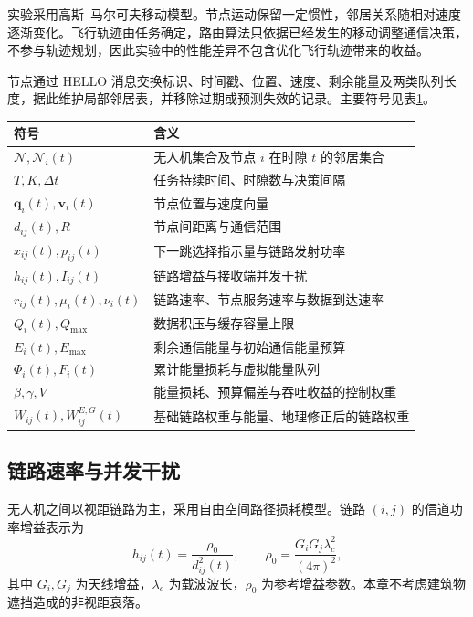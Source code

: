 实验采用高斯--马尔可夫移动模型。节点运动保留一定惯性，邻居关系随相对速度逐渐变化。飞行轨迹由任务确定，路由算法只依据已经发生的移动调整通信决策，不参与轨迹规划，因此实验中的性能差异不包含优化飞行轨迹带来的收益。

节点通过 HELLO 消息交换标识、时间戳、位置、速度、剩余能量及两类队列长度，据此维护局部邻居表，并移除过期或预测失效的记录。主要符号见表\ref{rq1:tab:notation}。

\begin{table}[!htbp]
\centering\small
{}
\label{rq1:tab:notation}
\begin{tabularx}{\textwidth}{lX}
\toprule
符号 & 含义 \\
\midrule
$\mathcal{N},\mathcal{N}_i(t)$ & 无人机集合及节点 $i$ 在时隙 $t$ 的邻居集合 \\
$T,K,\Delta t$ & 任务持续时间、时隙数与决策间隔 \\
$\bm q_i(t),\bm v_i(t)$ & 节点位置与速度向量 \\
$d_{ij}(t),R$ & 节点间距离与通信范围 \\
$x_{ij}(t),p_{ij}(t)$ & 下一跳选择指示量与链路发射功率 \\
$h_{ij}(t),I_{ij}(t)$ & 链路增益与接收端并发干扰 \\
$r_{ij}(t),\mu_i(t),\nu_i(t)$ & 链路速率、节点服务速率与数据到达速率 \\
$Q_i(t),Q_{\max}$ & 数据积压与缓存容量上限 \\
$E_i(t),E_{\max}$ & 剩余通信能量与初始通信能量预算 \\
$\Phi_i(t),F_i(t)$ & 累计能量损耗与虚拟能量队列 \\
$\beta,\gamma,V$ & 能量损耗、预算偏差与吞吐收益的控制权重 \\
$W_{ij}(t),W_{ij}^{E,G}(t)$ & 基础链路权重与能量、地理修正后的链路权重 \\
\bottomrule
\end{tabularx}
\end{table}

\subsection{链路速率与并发干扰}

无人机之间以视距链路为主，采用自由空间路径损耗模型\cite{qtar}。链路 $(i,j)$ 的信道功率增益表示为
\begin{equation}
 h_{ij}(t)=\frac{\rho_0}{d_{ij}^{2}(t)},\qquad
 \rho_0=\frac{G_iG_j\lambda_c^{2}}{(4\pi)^2},
 \label{rq1:eq:gain}
\end{equation}
其中 $G_i,G_j$ 为天线增益，$\lambda_c$ 为载波波长，$\rho_0$ 为参考增益参数。本章不考虑建筑物遮挡造成的非视距衰落。

